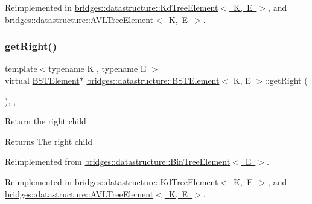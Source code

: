 Reimplemented in \mbox{\hyperlink{classbridges_1_1datastructure_1_1_kd_tree_element_a653597918fbc6e31b84fcf8dbdf67122}{bridges\+::datastructure\+::\+Kd\+Tree\+Element$<$ K, E $>$}}, and \mbox{\hyperlink{classbridges_1_1datastructure_1_1_a_v_l_tree_element_a4a639e0c623435aadf5c51ed132cb25d}{bridges\+::datastructure\+::\+A\+V\+L\+Tree\+Element$<$ K, E $>$}}.

\mbox{\label{classbridges_1_1datastructure_1_1_b_s_t_element_a80f5085d6d03805dd3091b7693d8e235}} 
\subsubsection{\texorpdfstring{get\+Right()}{getRight()}\hspace{0.1cm}{\footnotesize\ttfamily [1/2]}}
{\footnotesize\ttfamily template$<$typename K , typename E $>$ \\
virtual \mbox{\hyperlink{classbridges_1_1datastructure_1_1_b_s_t_element}{B\+S\+T\+Element}}$\ast$ \mbox{\hyperlink{classbridges_1_1datastructure_1_1_b_s_t_element}{bridges\+::datastructure\+::\+B\+S\+T\+Element}}$<$ K, E $>$\+::get\+Right (\begin{DoxyParamCaption}{ }\end{DoxyParamCaption})\hspace{0.3cm}{\ttfamily [inline]}, {\ttfamily [override]}, {\ttfamily [virtual]}}

Return the right child \begin{DoxyReturn}{Returns}
The right child 
\end{DoxyReturn}


Reimplemented from \mbox{\hyperlink{classbridges_1_1datastructure_1_1_bin_tree_element_ae1e6bde8cc03cf5da5a7930354fdf592}{bridges\+::datastructure\+::\+Bin\+Tree\+Element$<$ E $>$}}.



Reimplemented in \mbox{\hyperlink{classbridges_1_1datastructure_1_1_kd_tree_element_a366e3b0987169220d3a145043be2373d}{bridges\+::datastructure\+::\+Kd\+Tree\+Element$<$ K, E $>$}}, and \mbox{\hyperlink{classbridges_1_1datastructure_1_1_a_v_l_tree_element_aed585fdf56fcbfebac6cd0262c9c1807}{bridges\+::datastructure\+::\+A\+V\+L\+Tree\+Element$<$ K, E $>$}}.

